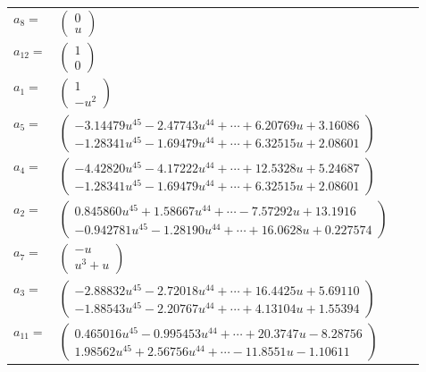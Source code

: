 \documentclass[1p]{elsarticle_modified}
\theoremstyle{definition}
\begin{document}
\begin{tabular}{m{7pt} m{180pt} m{7pt} m{180pt} }
\flushright $a_{8}=$&$\begin{pmatrix}0\\u\end{pmatrix}$ \\
\flushright $a_{12}=$&$\begin{pmatrix}1\\0\end{pmatrix}$ \\
\flushright $a_{1}=$&$\begin{pmatrix}1\\- u^2\end{pmatrix}$ \\
\flushright $a_{5}=$&$\begin{pmatrix}-3.14479 u^{45}-2.47743 u^{44}+\cdots+6.20769 u+3.16086\\-1.28341 u^{45}-1.69479 u^{44}+\cdots+6.32515 u+2.08601\end{pmatrix}$ \\
\flushright $a_{4}=$&$\begin{pmatrix}-4.42820 u^{45}-4.17222 u^{44}+\cdots+12.5328 u+5.24687\\-1.28341 u^{45}-1.69479 u^{44}+\cdots+6.32515 u+2.08601\end{pmatrix}$ \\
\flushright $a_{2}=$&$\begin{pmatrix}0.845860 u^{45}+1.58667 u^{44}+\cdots-7.57292 u+13.1916\\-0.942781 u^{45}-1.28190 u^{44}+\cdots+16.0628 u+0.227574\end{pmatrix}$ \\
\flushright $a_{7}=$&$\begin{pmatrix}- u\\u^3+u\end{pmatrix}$ \\
\flushright $a_{3}=$&$\begin{pmatrix}-2.88832 u^{45}-2.72018 u^{44}+\cdots+16.4425 u+5.69110\\-1.88543 u^{45}-2.20767 u^{44}+\cdots+4.13104 u+1.55394\end{pmatrix}$ \\
\flushright $a_{11}=$&$\begin{pmatrix}0.465016 u^{45}-0.995453 u^{44}+\cdots+20.3747 u-8.28756\\1.98562 u^{45}+2.56756 u^{44}+\cdots-11.8551 u-1.10611\end{pmatrix}$ \\

\end{tabular}
\end{document}
